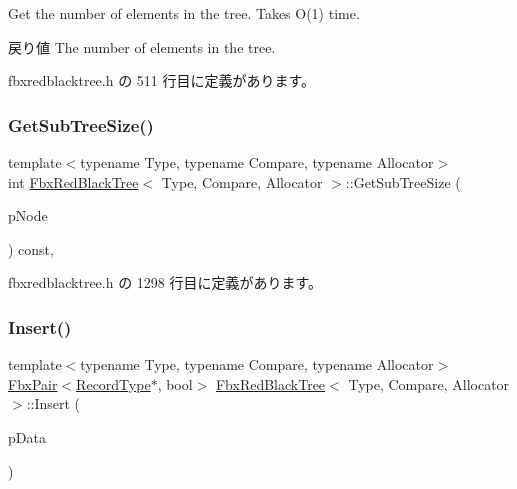 Get the number of elements in the tree. Takes O(1) time. \begin{DoxyReturn}{戻り値}
The number of elements in the tree. 
\end{DoxyReturn}


 fbxredblacktree.\+h の 511 行目に定義があります。

\mbox{\label{class_fbx_red_black_tree_a1eacc00900b47600528a379ed8882d0c}} 
\subsubsection{\texorpdfstring{Get\+Sub\+Tree\+Size()}{GetSubTreeSize()}}
{\footnotesize\ttfamily template$<$typename Type, typename Compare, typename Allocator$>$ \\
int \hyperlink{class_fbx_red_black_tree}{Fbx\+Red\+Black\+Tree}$<$ Type, Compare, Allocator $>$\+::Get\+Sub\+Tree\+Size (\begin{DoxyParamCaption}\item[{\hyperlink{class_fbx_red_black_tree_1_1_record_type}{Record\+Type} $\ast$}]{p\+Node }\end{DoxyParamCaption}) const\hspace{0.3cm}{\ttfamily [inline]}, {\ttfamily [protected]}}



 fbxredblacktree.\+h の 1298 行目に定義があります。

\mbox{\label{class_fbx_red_black_tree_ab5f48f09ad534b7a11a45a4abe461b87}} 
\subsubsection{\texorpdfstring{Insert()}{Insert()}}
{\footnotesize\ttfamily template$<$typename Type, typename Compare, typename Allocator$>$ \\
\hyperlink{class_fbx_pair}{Fbx\+Pair}$<$\hyperlink{class_fbx_red_black_tree_1_1_record_type}{Record\+Type}$\ast$, bool$>$ \hyperlink{class_fbx_red_black_tree}{Fbx\+Red\+Black\+Tree}$<$ Type, Compare, Allocator $>$\+::Insert (\begin{DoxyParamCaption}\item[{const \hyperlink{class_fbx_red_black_tree_a9bd3feb4c82e7d105bc475f01a9a199d}{Data\+Type} \&}]{p\+Data }\end{DoxyParamCaption})\hspace{0.3cm}{\ttfamily [inline]}}

